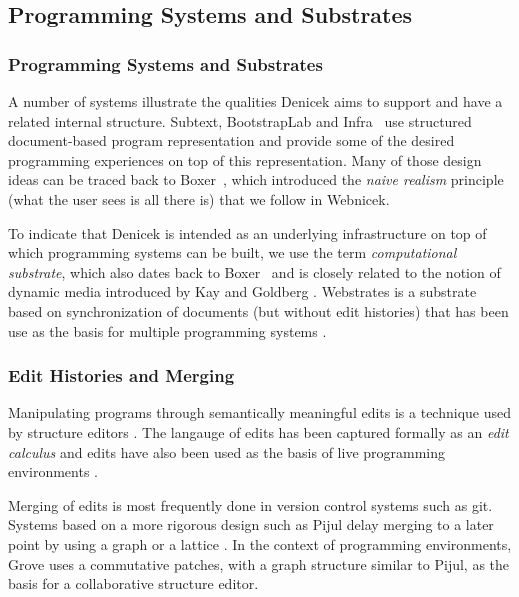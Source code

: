 \documentclass[sigconf,anonymous,screen]{acmart}
\begin{document}

\subsection{Programming Systems and Substrates}
\label{sec:background-sys}

\subsubsection*{Programming Systems and Substrates}
A number of systems illustrate the qualities Denicek aims to support and have a related internal
structure. Subtext, BootstrapLab and Infra~\cite{edwards-2005-subtext,jakubovic-2022-ladder,hall-2017-infra}
use structured document-based program representation and provide some of the desired programming
experiences on top of this representation. Many of those design ideas can be traced back to
Boxer~\cite{disessa-1986-boxer}, which introduced the \emph{naive realism} principle (what the user
sees is all there is) that we follow in Webnicek.

To indicate that Denicek is intended as an underlying infrastructure on top of which programming
systems can be built, we use the term \emph{computational substrate}, which also dates back to
Boxer~\cite{disessa-1995-epistemology} and is closely related to the notion of dynamic media
introduced by Kay and Goldberg \cite{kay-1977-media}. Webstrates \cite{klokmose-2015-webstrates}
is a substrate based on synchronization of documents (but without edit histories) that has been
use as the basis for multiple programming systems \cite{radle-2017-codestrates,borowski-2022-varv}.

\subsubsection*{Edit Histories and Merging}
Manipulating programs through semantically meaningful edits is a technique used by structure
editors \cite{teitelbaum-1981-cps,hempel-2018-deuce,beckman-2023-sandblocks}. The langauge of
edits has been captured formally as an \emph{edit calculus} \cite{omar-2017-hazelnut} and
edits have also been used as the basis of live programming environments \cite{storm-2013-deltas}.

Merging of edits is most frequently done in version control systems such as git. Systems based
on a more rigorous design such as Pijul \cite{meunier-2024-pijul} delay merging to a later point
by using a graph or a lattice \cite{schurmann-2022-merging}. In the context of
programming environments, Grove \cite{adams-2025-grove} uses a commutative patches, with a graph
structure similar to Pijul, as the basis for a collaborative structure editor.
\end{document}
